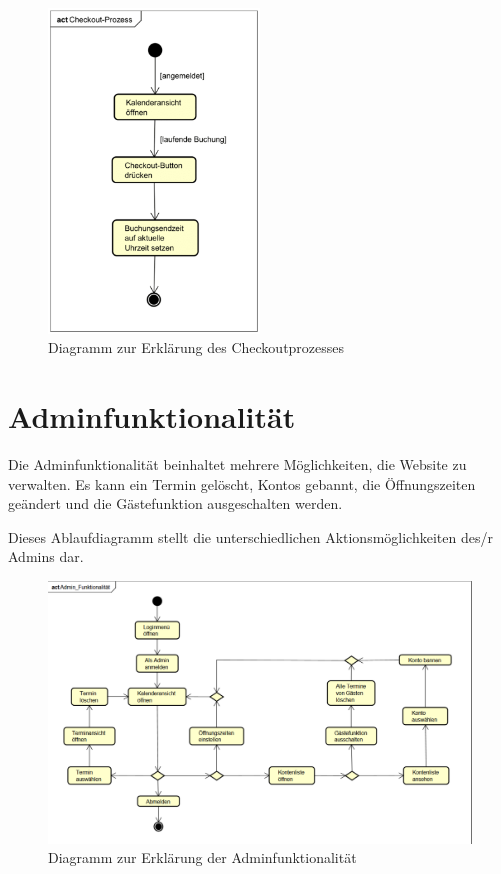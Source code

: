 \begin{figure}[ht]
    \centering
    \includegraphics[width=0.5\textwidth]{figures/activity/checkoutprozess}
    \caption{Diagramm zur Erklärung des Checkoutprozesses}
    \label{fig:logout-diagram}
\end{figure}

\clearpage

\section{Adminfunktionalität}

Die Adminfunktionalität beinhaltet mehrere Möglichkeiten, die Website zu verwalten.
Es kann ein Termin gelöscht, Kontos gebannt, die Öffnungszeiten geändert und die Gästefunktion
ausgeschalten werden.

Dieses Ablaufdiagramm stellt die unterschiedlichen Aktionsmöglichkeiten des/r Admins dar.

\begin{figure}[ht]
    \centering
    \includegraphics[width=\textwidth]{figures/activity/adminfunk}
    \caption{Diagramm zur Erklärung der Adminfunktionalität}
    \label{fig:admin-functions-diagram}
\end{figure}
\clearpage
